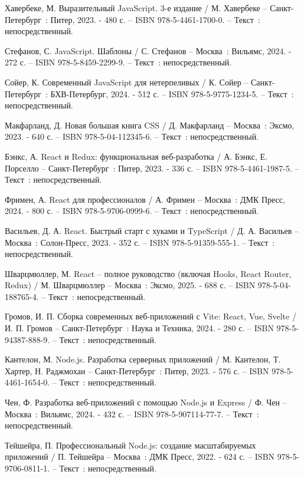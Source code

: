 \begin{thebibliography}{99}
	 Хавербеке, М. Выразительный JavaScript. 3-е издание / М. Хавербеке – Санкт-Петербург~: Питер, 2023. - 480 с. – ISBN 978-5-4461-1700-0. – Текст~: непосредственный.
	
	 Стефанов, С. JavaScript. Шаблоны / С. Стефанов – Москва~: Вильямс, 2024. - 272 с. – ISBN 978-5-8459-2299-9. – Текст~: непосредственный.
	
	 Сойер, К. Современный JavaScript для нетерпеливых / К. Сойер – Санкт-Петербург~: БХВ-Петербург, 2024. - 512 с. – ISBN 978-5-9775-1234-5. – Текст~: непосредственный.
	
	 Макфарланд, Д. Новая большая книга CSS / Д. Макфарланд – Москва~: Эксмо, 2023. - 640 с. – ISBN 978-5-04-112345-6. – Текст~: непосредственный.
	
	 Бэнкс, А. React и Redux: функциональная веб-разработка / А. Бэнкс, Е. Порселло – Санкт-Петербург~: Питер, 2023. - 336 с. – ISBN 978-5-4461-1987-5. – Текст~: непосредственный.
	
	 Фримен, А. React для профессионалов / А. Фримен – Москва~: ДМК Пресс, 2024. - 800 с. – ISBN 978-5-9706-0999-6. – Текст~: непосредственный.
	
	 Васильев, Д. А. React. Быстрый старт с хуками и TypeScript / Д. А. Васильев – Москва~: Солон-Пресс, 2023. - 352 с. – ISBN 978-5-91359-555-1. – Текст~: непосредственный.
	
	 Шварцмюллер, М. React – полное руководство (включая Hooks, React Router, Redux) / М. Шварцмюллер – Москва~: Эксмо, 2025. - 688 с. – ISBN 978-5-04-188765-4. – Текст~: непосредственный.
	
	 Громов, И. П. Сборка современных веб-приложений с Vite: React, Vue, Svelte / И. П. Громов – Санкт-Петербург~: Наука и Техника, 2024. - 280 с. – ISBN 978-5-94387-888-9. – Текст~: непосредственный.
	
	 Кантелон, М. Node.js. Разработка серверных приложений / М. Кантелон, Т. Хартер, Н. Раджмохан – Санкт-Петербург~: Питер, 2023. - 576 с. – ISBN 978-5-4461-1654-0. – Текст~: непосредственный.
	
	 Чен, Ф. Разработка веб-приложений с помощью Node.js и Express / Ф. Чен – Москва~: Вильямс, 2024. - 432 с. – ISBN 978-5-907114-77-7. – Текст~: непосредственный.
	
	 Тейшейра, П. Профессиональный Node.js: создание масштабируемых приложений / П. Тейшейра – Москва~: ДМК Пресс, 2022. - 624 с. – ISBN 978-5-9706-0811-1. – Текст~: непосредственный.
	

\end{thebibliography}
